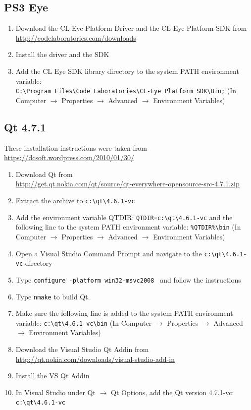 \subsection*{PS3 Eye}
\begin{enumerate}
\item Download the CL Eye Platform Driver and the CL Eye Platform SDK from \\ \url{http://codelaboratories.com/downloads}
\item Install the driver and the SDK
\item Add the CL Eye SDK library directory to the system PATH environment variable: \\ \texttt{C:\textbackslash Program Files\textbackslash Code Laboratories\textbackslash CL-Eye Platform SDK\textbackslash Bin;} (In Computer $\rightarrow$ Properties $\rightarrow$ Advanced $\rightarrow$ Environment Variables) 
\end{enumerate}
\subsection*{Qt 4.7.1}
These installation instructions were taken from \\ \url{https://dcsoft.wordpress.com/2010/01/30/}
\begin{enumerate}
\item Download Qt from \\ \url{http://get.qt.nokia.com/qt/source/qt-everywhere-opensource-src-4.7.1.zip}
\item Extract the archive to \texttt{c:\textbackslash qt\textbackslash 4.6.1-vc}
\item Add the environment variable QTDIR: \texttt{QTDIR=c:\textbackslash qt\textbackslash 4.6.1-vc} and the following line to the system PATH environment variable: \texttt{\%QTDIR\%\textbackslash bin} (In Computer $\rightarrow$ Properties $\rightarrow$ Advanced $\rightarrow$ Environment Variables) 
\item Open a Visual Studio Command Prompt and navigate to the \texttt{c:\textbackslash qt\textbackslash 4.6.1-vc} directory
\item Type \texttt{configure -platform win32-msvc2008 } and follow the instructions
\item Type \texttt{nmake} to build Qt.
\item Make sure the following line is added to the system PATH environment variable: \texttt{c:\textbackslash qt\textbackslash 4.6.1-vc\textbackslash bin} (In Computer $\rightarrow$ Properties $\rightarrow$ Advanced $\rightarrow$ Environment Variables) 
\item Download the Visual Studio Qt Addin from \\ \url{http://qt.nokia.com/downloads/visual-studio-add-in}
\item Install the VS Qt Addin
\item In Visual Studio under Qt $\rightarrow$ Qt Options, add the Qt version 4.7.1-vc: \\ \texttt{c:\textbackslash qt\textbackslash 4.6.1-vc}

\end{enumerate}

